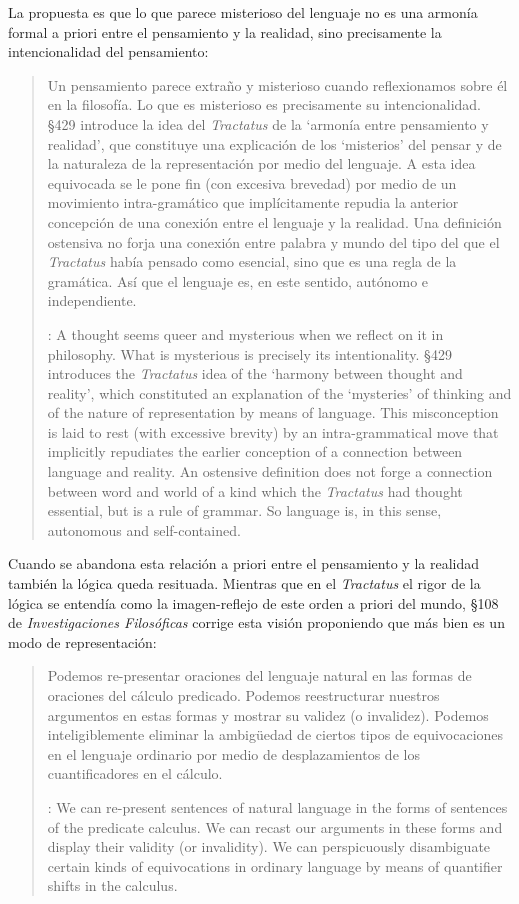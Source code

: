   La propuesta es que lo que parece misterioso del lenguaje no es una armonía formal a priori entre el pensamiento y la realidad, sino precisamente la intencionalidad del pensamiento: \blockquote[{\cite[4]{hacker2000mind}}: A thought seems queer and mysterious when we reflect on it in philosophy. What is mysterious is precisely its intentionality. \S429 introduces the \emph{Tractatus} idea of the `harmony between thought and reality', which constituted an explanation of the `mysteries' of thinking and of the nature of representation by means of language. This misconception is laid to rest (with excessive brevity) by an intra-grammatical move that implicitly repudiates the earlier conception of a connection between language and reality. An ostensive definition does not forge a connection between word and world of a kind which the \emph{Tractatus} had thought essential, but is a rule of grammar. So language is, in this sense, autonomous and self-contained.]{Un pensamiento parece extraño y misterioso cuando reflexionamos sobre él en la filosofía. Lo que es misterioso es precisamente su intencionalidad. \S429 introduce la idea del \emph{Tractatus} de la `armonía entre pensamiento y realidad', que constituye una explicación de los `misterios' del pensar y de la naturaleza de la representación por medio del lenguaje. A esta idea equivocada se le pone fin (con excesiva brevedad) por medio de un movimiento intra-gramático que implícitamente repudia la anterior concepción de una conexión entre el lenguaje y la realidad. Una definición ostensiva no forja una conexión entre palabra y mundo del tipo del que el \emph{Tractatus} había pensado como esencial, sino que es una regla de la gramática. Así que el lenguaje es, en este sentido, autónomo e independiente.}

  Cuando se abandona esta relación a priori entre el pensamiento y la realidad también la lógica queda resituada. Mientras que en el \emph{Tractatus} el rigor de la lógica se entendía como la imagen-reflejo de este orden a priori del mundo, \S108 de \emph{Investigaciones Filosóficas} corrige esta visión proponiendo que más bien es un modo de representación: \blockquote[{\cite[242]{bakerhacker2009understanding}}: We can re-present sentences of natural language in the forms of sentences of the predicate calculus. We can recast our arguments in these forms and display their validity (or invalidity). We can perspicuously disambiguate certain kinds of equivocations in ordinary language by means of quantifier shifts in the calculus.]{Podemos re-presentar oraciones del lenguaje natural en las formas de oraciones del cálculo predicado. Podemos reestructurar nuestros argumentos en estas formas y mostrar su validez (o invalidez). Podemos inteligiblemente eliminar la ambigüedad de ciertos tipos de equivocaciones en el lenguaje ordinario por medio de desplazamientos de los cuantificadores en el cálculo.}

